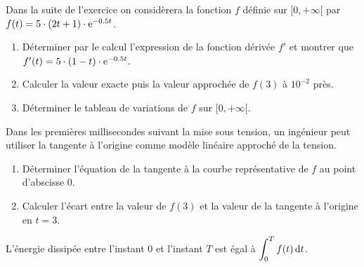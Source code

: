 \medskip

Dans la suite de l'exercice on considèrera la fonction $f$ définie sur $[0,+\infty[$ par $f(t)=5\cdot (2t+1)\cdot \mathrm{e}^{-0.5t}$.

\begin{enumerate}[series=monDS, resume]
    \item Déterminer par le calcul l'expression de la fonction dérivée $f'$ et montrer que $f'(t)=5\cdot (1-t)\cdot \mathrm{e}^{-0.5t}$. 
    \begin{blocvisiblex}[height=3]
    {\quad}
    \end{blocvisiblex}
    \medskip
    \item Calculer la valeur exacte puis la valeur approchée de $f(3)$ à $10^{-2}$ près.
    \begin{blocvisiblex}[height=2]
    {\quad}
    \end{blocvisiblex}
    \medskip
    \item Déterminer le tableau de variations de $f$ sur $[0,+\infty[$.
    \begin{blocvisiblex}[height=5]
    {\quad}
    \end{blocvisiblex}
\end{enumerate}

\medskip

Dans les premières millisecondes suivant la mise sous tension, un ingénieur peut utiliser la tangente à l'origine comme modèle linéaire approché de la tension. 

\begin{enumerate}[series=monDS, resume]
    \item Déterminer l'équation de la tangente à la courbe représentative de $f$ au point d'abscisse $0$.
    \begin{blocvisiblex}[height=2]
    {\quad}
    \end{blocvisiblex}
    \medskip
    \item Calculer l'écart entre la valeur de $f(3)$ et la valeur de la tangente à l'origine en $t=3$.
    \begin{blocvisiblex}[height=2]
    {\quad}
    \end{blocvisiblex}
    \medskip
\end{enumerate}

\medskip

L'énergie dissipée entre l'instant 0 et l'instant $T$ est égal à $\displaystyle \int_{0}^{T} f(t) \,\mathrm{d}t$.

